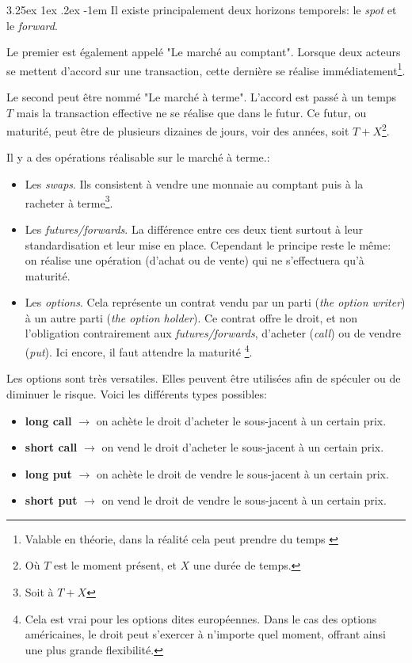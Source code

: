 \documentclass[a4paper, 11pt]{article}
\makeatletter
\renewcommand\paragraph{\@startsection{paragraph}{5}{\z@}%
  {3.25ex \@plus1ex \@minus.2ex}%
  {-1em}%
  {\normalfont\normalsize\bfseries}}
\makeatother
\begin{document}
\paragraph{}
Il existe principalement deux horizons temporels: le \textit{spot} et le \textit{forward}.

Le premier est également appelé "Le marché au comptant". Lorsque deux acteurs se mettent d'accord sur une transaction,
cette dernière se réalise 
immédiatement\footnote{Valable en théorie, dans la réalité cela peut prendre du temps \cite{marche_des_changes}}.

Le second peut être nommé "Le marché à terme". L'accord est passé à un temps $T$ mais la transaction effective ne
se réalise que dans le futur. Ce futur, ou maturité, peut être de plusieurs dizaines de jours,
voir des années, soit $T + X$\footnote{Où $T$ est le moment présent, et $X$ une durée de temps.}.

Il y a des opérations réalisable sur le marché à terme.:
\begin{itemize}
\item Les \textit{swaps}. Ils consistent à vendre une monnaie au comptant puis à la racheter à terme\footnote{Soit à $T+X$}.

\item Les \textit{futures/forwards}. La différence entre ces deux tient surtout à leur standardisation et leur mise en place.
Cependant le principe reste le même: on réalise une opération (d'achat ou de vente) qui ne s'effectuera qu'à maturité.

\item Les \textit{options}. Cela représente un contrat vendu par un parti (\textit{the option writer}) 
à un autre parti (\textit{the option holder}). Ce contrat offre le droit, et non l'obligation contrairement 
aux \textit{futures/forwards}, d'acheter (\textit{call}) ou de vendre (\textit{put}). Ici encore, il faut attendre la maturité
\footnote{Cela est vrai pour les options dites européennes\cite{investopedia_option_europeenne}. 
Dans le cas des options américaines\cite{investopedia_option_americaine}, le droit peut s'exercer à n'importe quel moment, offrant
ainsi une plus grande flexibilité.}.
\end{itemize}

Les options sont très versatiles. Elles peuvent être utilisées afin de spéculer ou de diminuer le risque. Voici les différents types possibles:
\begin{itemize}
\item \textbf{long call} $\rightarrow$ on achète le droit d'acheter le sous-jacent à un certain prix.
\item \textbf{short call} $\rightarrow$ on vend le droit d'acheter le sous-jacent à un certain prix.
\item \textbf{long put} $\rightarrow$ on achète le droit de vendre le sous-jacent à un certain prix.
\item \textbf{short put} $\rightarrow$ on vend le droit de vendre le sous-jacent à un certain prix.
\end{itemize}
\end{document}
